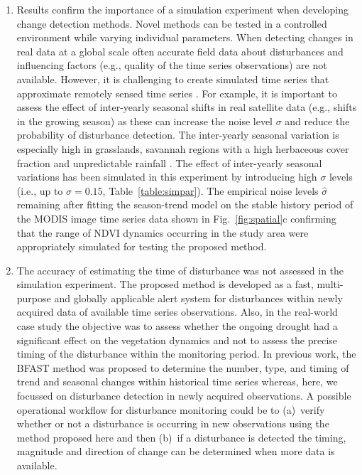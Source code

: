 \documentclass[authoryear,preprint,review,10pt]{elsarticle}
\begin{document}
\begin{enumerate}[(1)]
\item Results confirm the importance of a simulation experiment when developing change detection methods. Novel methods can be tested in a controlled
environment while varying individual parameters. When detecting changes in real data at a global scale often accurate field data about disturbances and
influencing factors (e.g., quality of the time series observations) are not available. However, it is challenging to create simulated time series that
approximate remotely sensed time series \citep{Zhang2009}. For example, it is important to assess the effect of inter-yearly seasonal shifts in real
satellite data (e.g., shifts in the growing season) as these can increase the noise level $\sigma$ and reduce the probability of disturbance detection. The
inter-yearly seasonal variation is especially high in grasslands, savannah regions with a high herbaceous cover fraction and unpredictable rainfall
\citep{deJong:wo}. The effect of inter-yearly seasonal variations has been simulated in this experiment by introducing high $\sigma$ levels (i.e., up to
$\sigma = 0.15$, Table~\ref{table:simpar}). The empirical noise levels $\hat\sigma$ remaining after fitting the season-trend model on the stable history period of the MODIS image time series data shown in Fig.~\ref{fig:spatial}c confirming that the range of NDVI dynamics occurring in the study area were appropriately simulated for testing the proposed method.


\item The accuracy of estimating the time of disturbance was not assessed in the simulation experiment. The proposed method is developed as a fast, multi-purpose and globally applicable alert system for disturbances within newly acquired data of available time series observations. Also, in the real-world case study the objective was to assess whether the ongoing drought had a significant effect on the vegetation dynamics and not to assess the precise timing of the disturbance within the monitoring period.
In previous work, the BFAST method was proposed to determine the number, type, and timing of trend and seasonal changes within historical time series \citep{Verbesselt2009a} whereas, here, we focussed on disturbance detection in newly acquired observations. A possible operational workflow for disturbance monitoring could be to (a)~verify whether or not a disturbance is occurring in new observations using the method proposed here and then (b)~if a disturbance is detected the timing, magnitude and direction of change can be determined when more data is available.  


\end{enumerate}
\end{document}
